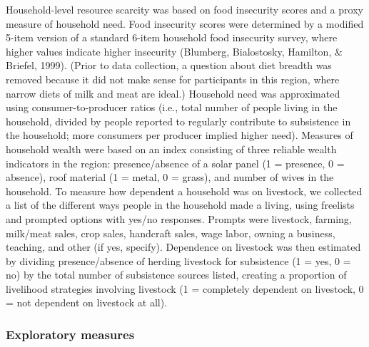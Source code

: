 \documentclass[
  11pt,
]{article}
\begin{document}
Household-level resource scarcity was based on food insecurity scores
and a proxy measure of household need. Food insecurity scores were
determined by a modified 5-item version of a standard 6-item household
food insecurity survey, where higher values indicate higher insecurity
(Blumberg, Bialostosky, Hamilton, \& Briefel, 1999). (Prior to data
collection, a question about diet breadth was removed because it did not
make sense for participants in this region, where narrow diets of milk
and meat are ideal.) Household need was approximated using
consumer-to-producer ratios (i.e., total number of people living in the
household, divided by people reported to regularly contribute to
subsistence in the household; more consumers per producer implied higher
need). Measures of household wealth were based on an index consisting of
three reliable wealth indicators in the region: presence/absence of a
solar panel (1 = presence, 0 = absence), roof material (1 = metal, 0 =
grass), and number of wives in the household. To measure how dependent a
household was on livestock, we collected a list of the different ways
people in the household made a living, using freelists and prompted
options with yes/no responses. Prompts were livestock, farming,
milk/meat sales, crop sales, handcraft sales, wage labor, owning a
business, teaching, and other (if yes, specify). Dependence on livestock
was then estimated by dividing presence/absence of herding livestock for
subsistence (1 = yes, 0 = no) by the total number of subsistence sources
listed, creating a proportion of livelihood strategies involving
livestock (1 = completely dependent on livestock, 0 = not dependent on
livestock at all).

\hypertarget{exploratory-measures}{%
\subsubsection{Exploratory measures}\label{exploratory-measures}}
\end{document}
